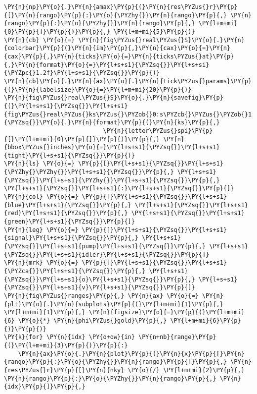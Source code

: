 \begin{Verbatim}[commandchars=\\\{\}]
    \PY{n}{np}\PY{o}{.}\PY{n}{amax}\PY{p}{(}\PY{n}{res\PYZus{}r}\PY{p}{[}\PY{n}{rango}\PY{p}{:}\PY{o}{\PYZhy{}}\PY{n}{rango}\PY{p}{,} \PY{n}{rango}\PY{p}{:}\PY{o}{\PYZhy{}}\PY{n}{rango}\PY{p}{,} \PY{l+m+mi}{0}\PY{p}{]}\PY{p}{)}\PY{p}{,} \PY{l+m+mi}{5}\PY{p}{)}
\PY{n}{cb} \PY{o}{=} \PY{n}{fig\PYZus{}real\PYZus{}S}\PY{o}{.}\PY{n}{colorbar}\PY{p}{(}\PY{n}{im}\PY{p}{,}\PY{n}{cax}\PY{o}{=}\PY{n}{cax}\PY{p}{,}\PY{n}{ticks}\PY{o}{=}\PY{n}{ticks\PYZus{}at}\PY{p}{,}\PY{n}{format}\PY{o}{=}\PY{l+s+s1}{\PYZsq{}}\PY{l+s+si}{\PYZpc{}1.2f}\PY{l+s+s1}{\PYZsq{}}\PY{p}{)}
\PY{n}{cb}\PY{o}{.}\PY{n}{ax}\PY{o}{.}\PY{n}{tick\PYZus{}params}\PY{p}{(}\PY{n}{labelsize}\PY{o}{=}\PY{l+m+mi}{20}\PY{p}{)}
\PY{n}{fig\PYZus{}real\PYZus{}S}\PY{o}{.}\PY{n}{savefig}\PY{p}{(}\PY{l+s+s1}{\PYZsq{}}\PY{l+s+s1}{fig\PYZus{}real\PYZus{}ks\PYZus{}\PYZob{}0:s\PYZcb{}\PYZus{}\PYZob{}1:s\PYZcb{}}\PY{l+s+s1}{\PYZsq{}}\PY{o}{.}\PY{n}{format}\PY{p}{(}\PY{n}{ks}\PY{p}{,}
                            \PY{n}{letter\PYZus{}spi}\PY{p}{[}\PY{l+m+mi}{0}\PY{p}{]}\PY{p}{)}\PY{p}{,} \PY{n}{bbox\PYZus{}inches}\PY{o}{=}\PY{l+s+s1}{\PYZsq{}}\PY{l+s+s1}{tight}\PY{l+s+s1}{\PYZsq{}}\PY{p}{)}
\PY{n}{ls} \PY{o}{=} \PY{p}{[}\PY{l+s+s1}{\PYZsq{}}\PY{l+s+s1}{\PYZhy{}\PYZhy{}}\PY{l+s+s1}{\PYZsq{}}\PY{p}{,} \PY{l+s+s1}{\PYZsq{}}\PY{l+s+s1}{\PYZhy{}}\PY{l+s+s1}{\PYZsq{}}\PY{p}{,} \PY{l+s+s1}{\PYZsq{}}\PY{l+s+s1}{:}\PY{l+s+s1}{\PYZsq{}}\PY{p}{]}
\PY{n}{col} \PY{o}{=} \PY{p}{[}\PY{l+s+s1}{\PYZsq{}}\PY{l+s+s1}{blue}\PY{l+s+s1}{\PYZsq{}}\PY{p}{,} \PY{l+s+s1}{\PYZsq{}}\PY{l+s+s1}{red}\PY{l+s+s1}{\PYZsq{}}\PY{p}{,} \PY{l+s+s1}{\PYZsq{}}\PY{l+s+s1}{green}\PY{l+s+s1}{\PYZsq{}}\PY{p}{]}
\PY{n}{leg} \PY{o}{=} \PY{p}{[}\PY{l+s+s1}{\PYZsq{}}\PY{l+s+s1}{signal}\PY{l+s+s1}{\PYZsq{}}\PY{p}{,} \PY{l+s+s1}{\PYZsq{}}\PY{l+s+s1}{pump}\PY{l+s+s1}{\PYZsq{}}\PY{p}{,} \PY{l+s+s1}{\PYZsq{}}\PY{l+s+s1}{idler}\PY{l+s+s1}{\PYZsq{}}\PY{p}{]}
\PY{n}{mrk} \PY{o}{=} \PY{p}{[}\PY{l+s+s1}{\PYZsq{}}\PY{l+s+s1}{\PYZca{}}\PY{l+s+s1}{\PYZsq{}}\PY{p}{,} \PY{l+s+s1}{\PYZsq{}}\PY{l+s+s1}{o}\PY{l+s+s1}{\PYZsq{}}\PY{p}{,} \PY{l+s+s1}{\PYZsq{}}\PY{l+s+s1}{v}\PY{l+s+s1}{\PYZsq{}}\PY{p}{]}
\PY{n}{fig\PYZus{}ranges}\PY{p}{,} \PY{n}{ax} \PY{o}{=} \PY{n}{plt}\PY{o}{.}\PY{n}{subplots}\PY{p}{(}\PY{l+m+mi}{1}\PY{p}{,} \PY{l+m+mi}{1}\PY{p}{,} \PY{n}{figsize}\PY{o}{=}\PY{p}{(}\PY{l+m+mi}{6} \PY{o}{*} \PY{n}{phi\PYZus{}gold}\PY{p}{,} \PY{l+m+mi}{6}\PY{p}{)}\PY{p}{)}
\PY{k}{for} \PY{n}{idx} \PY{o+ow}{in} \PY{n+nb}{range}\PY{p}{(}\PY{l+m+mi}{3}\PY{p}{)}\PY{p}{:}
    \PY{n}{ax}\PY{o}{.}\PY{n}{plot}\PY{p}{(}\PY{n}{x}\PY{p}{[}\PY{n}{rango}\PY{p}{:}\PY{o}{\PYZhy{}}\PY{n}{rango}\PY{p}{]}\PY{p}{,} \PY{n}{res\PYZus{}r}\PY{p}{[}\PY{n}{nky} \PY{o}{/} \PY{l+m+mi}{2}\PY{p}{,} \PY{n}{rango}\PY{p}{:}\PY{o}{\PYZhy{}}\PY{n}{rango}\PY{p}{,} \PY{n}{idx}\PY{p}{]}\PY{p}{,}

\end{Verbatim}
